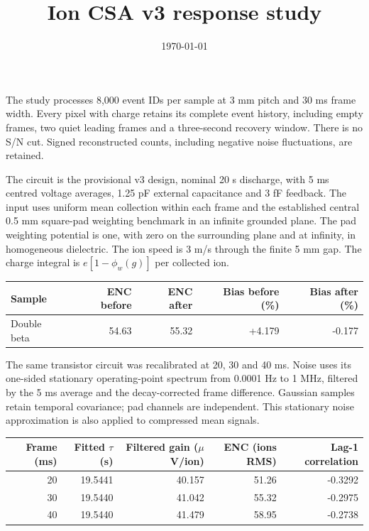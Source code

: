 \documentclass[10pt,a4paper]{article}
\title{Ion CSA v3 response study}
\date{\today}
\begin{document}
\maketitle
The study processes 8,000 event IDs per sample at 3 mm pitch
and 30 ms frame width. Every pixel with charge retains its
complete event history, including empty frames, two quiet leading frames and a
three-second recovery window. There is no S/N cut. Signed reconstructed counts,
including negative noise fluctuations, are retained.

The circuit is the provisional v3 design, nominal 20 s discharge, with 5 ms
centred voltage averages, 1.25 pF external capacitance and 3 fF feedback. The input
uses uniform mean collection within each frame and the established central
0.5 mm square-pad weighting benchmark in an infinite grounded plane. The pad
weighting potential is one, with zero on the surrounding plane and at infinity,
in homogeneous dielectric. The ion speed is 3 m/s through the finite 5 mm gap.
The charge integral is $e[1-\phi_w(g)]$ per collected ion.

\begin{center}\small\begin{tabular}{lrrrr}\toprule Sample & ENC before & ENC after & Bias before (\%) & Bias after (\%)\\\midrule
Double beta & 54.63 & 55.32 & +4.179 & -0.177 \\\bottomrule\end{tabular}\end{center}

The same transistor circuit was recalibrated at 20, 30 and 40 ms. Noise uses its
one-sided stationary operating-point spectrum from 0.0001 Hz to 1 MHz, filtered
by the 5 ms average and the decay-corrected frame difference. Gaussian samples
retain temporal covariance; pad channels are independent. This stationary noise
approximation is also applied to compressed mean signals.
\begin{center}\begin{tabular}{rrrrr}\toprule
Frame (ms) & Fitted $\tau$ (s) & Filtered gain ($\mu$V/ion) & ENC (ions RMS) & Lag-1 correlation\\\midrule
20 & 19.5441 & 40.157 & 51.26 & -0.3292 \\
30 & 19.5440 & 41.042 & 55.32 & -0.2975 \\
40 & 19.5440 & 41.479 & 58.95 & -0.2738 \\
\bottomrule\end{tabular}\end{center}
\end{document}

